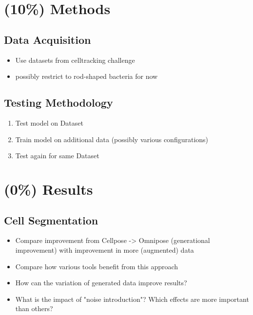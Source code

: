 \documentclass{article}
\begin{document}
\section{(10\%) Methods}
\subsection{Data Acquisition}
\begin{itemize}
    \item Use datasets from celltracking challenge
    \item possibly restrict to rod-shaped bacteria for now
\end{itemize}
\subsection{Testing Methodology}
\begin{enumerate}
    \item Test model on Dataset
    \item Train model on additional data (possibly various configurations)
    \item Test again for same Dataset
\end{enumerate}

\section{(0\%) Results}
\subsection{Cell Segmentation}
\begin{itemize}
    \item Compare improvement from Cellpose -> Omnipose (generational improvement) with improvement
        in more (augmented) data
    \item Compare how various tools benefit from this approach
    \item How can the variation of generated data improve results?
    \item What is the impact of "noise introduction"? Which effects are more important than others?
\end{itemize}
\end{document}
